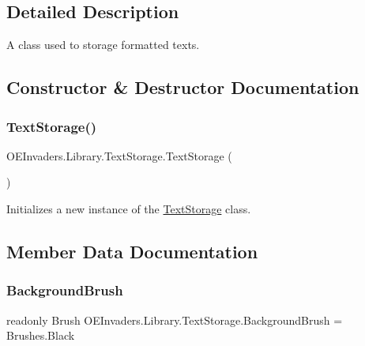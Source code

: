 \subsection{Detailed Description}
A class used to storage formatted texts. 



\subsection{Constructor \& Destructor Documentation}
\mbox{\label{class_o_e_invaders_1_1_library_1_1_text_storage_a2718adaf0377ff8058f9ae49a3a8bff2}} 
\subsubsection{\texorpdfstring{TextStorage()}{TextStorage()}}
{\footnotesize\ttfamily O\+E\+Invaders.\+Library.\+Text\+Storage.\+Text\+Storage (\begin{DoxyParamCaption}{ }\end{DoxyParamCaption})}



Initializes a new instance of the \mbox{\hyperlink{class_o_e_invaders_1_1_library_1_1_text_storage}{Text\+Storage}} class. 



\subsection{Member Data Documentation}
\mbox{\label{class_o_e_invaders_1_1_library_1_1_text_storage_a597e73ba713d67d0b0c0d1b20f0040e3}} 
\subsubsection{\texorpdfstring{BackgroundBrush}{BackgroundBrush}}
{\footnotesize\ttfamily readonly Brush O\+E\+Invaders.\+Library.\+Text\+Storage.\+Background\+Brush = Brushes.\+Black}



